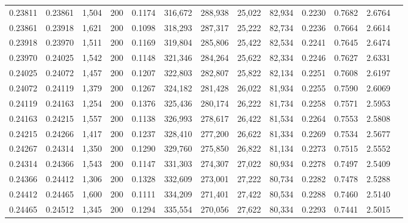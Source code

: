 \begin{tabular}{rrrrrrrrrrrrr}
0.23811 & 0.23861 & 1,504 & 200 &                                     0.1174 & 316,672 & 288,938 &  25,022 &  82,934 & 0.2230 & 0.7682 & 2.6764 \\
0.23861 & 0.23918 & 1,621 & 200 &                                     0.1098 & 318,293 & 287,317 &  25,222 &  82,734 & 0.2236 & 0.7664 & 2.6614 \\
0.23918 & 0.23970 & 1,511 & 200 &                                     0.1169 & 319,804 & 285,806 &  25,422 &  82,534 & 0.2241 & 0.7645 & 2.6474 \\
0.23970 & 0.24025 & 1,542 & 200 &                                     0.1148 & 321,346 & 284,264 &  25,622 &  82,334 & 0.2246 & 0.7627 & 2.6331 \\
0.24025 & 0.24072 & 1,457 & 200 &                                     0.1207 & 322,803 & 282,807 &  25,822 &  82,134 & 0.2251 & 0.7608 & 2.6197 \\
0.24072 & 0.24119 & 1,379 & 200 &                                     0.1267 & 324,182 & 281,428 &  26,022 &  81,934 & 0.2255 & 0.7590 & 2.6069 \\
0.24119 & 0.24163 & 1,254 & 200 &                                     0.1376 & 325,436 & 280,174 &  26,222 &  81,734 & 0.2258 & 0.7571 & 2.5953 \\
0.24163 & 0.24215 & 1,557 & 200 &                                     0.1138 & 326,993 & 278,617 &  26,422 &  81,534 & 0.2264 & 0.7553 & 2.5808 \\
0.24215 & 0.24266 & 1,417 & 200 &                                     0.1237 & 328,410 & 277,200 &  26,622 &  81,334 & 0.2269 & 0.7534 & 2.5677 \\
0.24267 & 0.24314 & 1,350 & 200 &                                     0.1290 & 329,760 & 275,850 &  26,822 &  81,134 & 0.2273 & 0.7515 & 2.5552 \\
0.24314 & 0.24366 & 1,543 & 200 &                                     0.1147 & 331,303 & 274,307 &  27,022 &  80,934 & 0.2278 & 0.7497 & 2.5409 \\
0.24366 & 0.24412 & 1,306 & 200 &                                     0.1328 & 332,609 & 273,001 &  27,222 &  80,734 & 0.2282 & 0.7478 & 2.5288 \\
0.24412 & 0.24465 & 1,600 & 200 &                                     0.1111 & 334,209 & 271,401 &  27,422 &  80,534 & 0.2288 & 0.7460 & 2.5140 \\
0.24465 & 0.24512 & 1,345 & 200 &                                     0.1294 & 335,554 & 270,056 &  27,622 &  80,334 & 0.2293 & 0.7441 & 2.5015 \\

\end{tabular}
